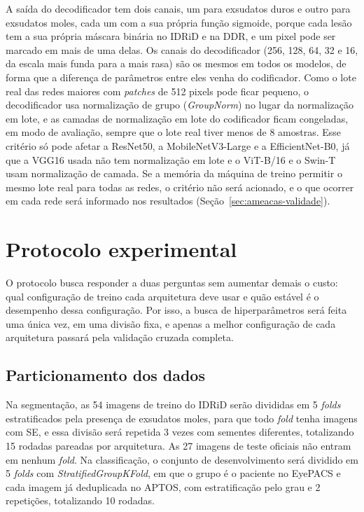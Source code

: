 A saída do decodificador tem dois canais, um para exsudatos duros e outro para exsudatos moles, cada um com a sua própria função sigmoide, porque cada lesão tem a sua própria máscara binária no IDRiD e na DDR, e um pixel pode ser marcado em mais de uma delas. Os canais do decodificador (256, 128, 64, 32 e 16, da escala mais funda para a mais rasa) são os mesmos em todos os modelos, de forma que a diferença de parâmetros entre eles venha do codificador. Como o lote real das redes maiores com \textit{patches} de 512 pixels pode ficar pequeno, o decodificador usa normalização de grupo (\textit{GroupNorm}) no lugar da normalização em lote, e as camadas de normalização em lote do codificador ficam congeladas, em modo de avaliação, sempre que o lote real tiver menos de 8 amostras. Esse critério só pode afetar a ResNet50, a MobileNetV3-Large e a EfficientNet-B0, já que a VGG16 usada não tem normalização em lote e o ViT-B/16 e o Swin-T usam normalização de camada. Se a memória da máquina de treino permitir o mesmo lote real para todas as redes, o critério não será acionado, e o que ocorrer em cada rede será informado nos resultados (Seção~\ref{sec:ameacas-validade}).

\section{Protocolo experimental}
\label{sec:protocolo-experimental}

O protocolo busca responder a duas perguntas sem aumentar demais o custo: qual configuração de treino cada arquitetura deve usar e quão estável é o desempenho dessa configuração. Por isso, a busca de hiperparâmetros será feita uma única vez, em uma divisão fixa, e apenas a melhor configuração de cada arquitetura passará pela validação cruzada completa.

\subsection{Particionamento dos dados}
\label{sec:particionamento}

Na segmentação, as 54 imagens de treino do IDRiD serão divididas em 5 \textit{folds} estratificados pela presença de exsudatos moles, para que todo \textit{fold} tenha imagens com SE, e essa divisão será repetida 3 vezes com sementes diferentes, totalizando 15 rodadas pareadas por arquitetura. As 27 imagens de teste oficiais não entram em nenhum \textit{fold}. Na classificação, o conjunto de desenvolvimento será dividido em 5 \textit{folds} com \textit{StratifiedGroupKFold}, em que o grupo é o paciente no EyePACS e cada imagem já deduplicada no APTOS, com estratificação pelo grau e 2 repetições, totalizando 10 rodadas.

